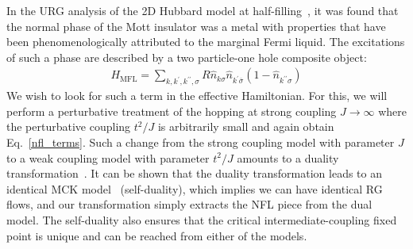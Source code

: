 \documentclass[reprint,prb,superscriptaddress]{revtex4-2}
\begin{document}
In the URG analysis of the 2D Hubbard model at half-filling~\cite{anirbanurg1}, it was found that the normal phase of the Mott insulator was a metal with properties that have been phenomenologically attributed to the marginal Fermi liquid. The excitations of such a phase are described by a two particle-one hole composite object:
\begin{equation}\begin{aligned}
	\label{mfl_urg}
	H_\text{MFL} = \sum_{k,k^\prime,k^{\prime\prime},\sigma}R \hat n_{k\sigma} \hat n_{k^\prime \overline\sigma}\left(1 - \hat n_{k^{\prime\prime}\sigma}\right) 
\end{aligned}\end{equation}
We wish to look for such a term in the effective Hamiltonian. For this, we will perform a perturbative treatment of the hopping at strong coupling \(J \to \infty\) where the perturbative coupling \(t^2/J\) is arbitrarily small and again obtain Eq.~\ref{nfl_terms}. Such a change from the strong coupling model with parameter \(J\) to a weak coupling model with parameter \(t^2/J\) amounts to a duality transformation~\cite{kroha_kolf_2007,zitko_fabrizio_2017}. It can be shown that the duality transformation leads to an identical MCK model~\cite{kroha_kolf_2007} (self-duality), which implies we can have identical RG flows, and our transformation simply extracts the NFL piece from the dual model. The self-duality also ensures that the critical intermediate-coupling fixed point is unique and can be reached from either of the models.
\end{document}
